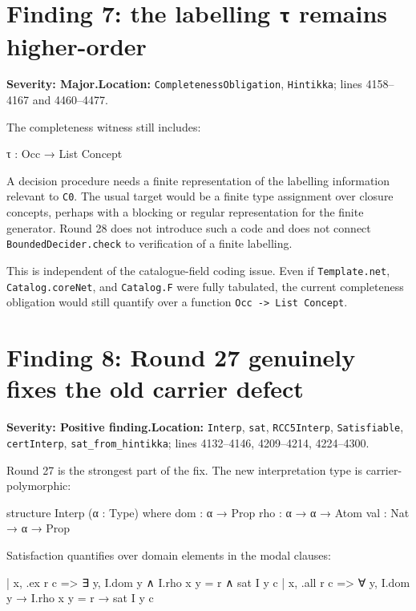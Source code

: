\documentclass[11pt]{article}
\newcommand{\sev}[1]{\textbf{Severity: #1}}
\begin{document}
\section{Finding 7: the labelling \texttt{τ} remains higher-order}

\sev{Major.}\quad \textbf{Location:} \texttt{CompletenessObligation}, \texttt{Hintikka}; lines 4158--4167 and 4460--4477.

The completeness witness still includes:

\begin{leancode}
τ : Occ → List Concept
\end{leancode}

A decision procedure needs a finite representation of the labelling information relevant to \texttt{C0}. The usual target would be a finite type assignment over closure concepts, perhaps with a blocking or regular representation for the finite generator. Round 28 does not introduce such a code and does not connect \texttt{BoundedDecider.check} to verification of a finite labelling.

This is independent of the catalogue-field coding issue. Even if \texttt{Template.net}, \texttt{Catalog.coreNet}, and \texttt{Catalog.F} were fully tabulated, the current completeness obligation would still quantify over a function \texttt{Occ -> List Concept}.

\section{Finding 8: Round 27 genuinely fixes the old carrier defect}

\sev{Positive finding.}\quad \textbf{Location:} \texttt{Interp}, \texttt{sat}, \texttt{RCC5Interp}, \texttt{Satisfiable}, \texttt{certInterp}, \texttt{sat\_from\_hintikka}; lines 4132--4146, 4209--4214, 4224--4300.

Round 27 is the strongest part of the fix. The new interpretation type is carrier-polymorphic:

\begin{leancode}
structure Interp (α : Type) where
  dom : α → Prop
  rho : α → α → Atom
  val : Nat → α → Prop
\end{leancode}

Satisfaction quantifies over domain elements in the modal clauses:

\begin{leancode}
| x, .ex r c => ∃ y, I.dom y ∧ I.rho x y = r ∧ sat I y c
| x, .all r c => ∀ y, I.dom y → I.rho x y = r → sat I y c
\end{leancode}
\end{document}
